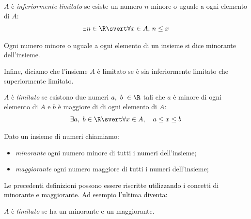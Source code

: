 \begin{newdef}{}{}
\(A\) è \emph{inferiormente limitato} se esiste un numero \(n\) 
minore o uguale a ogni elemento di \(A\):
\[\exists n \in \R \svert \forall x \in A,\, n \leq x\]
\end{newdef}

Ogni numero minore o uguale a ogni elemento di un insieme si dice minorante 
dell'insieme.


\vspace{.5em}
Infine, diciamo che l'insieme \(A\) è limitato se è sia inferiormente 
limitato che superiormente limitato.

\begin{newdef}{}{}
\(A\) è \emph{limitato} se esistono due numeri \(a,~b~ \in \R\) tali che 
\(a\) è minore di ogni elemento di \(A\) e \(b\) è maggiore di di ogni 
elemento di \(A\):
\[\exists a,~b \in \R \svert \forall x \in A,\quad a \leq x \leq b\]
\end{newdef}

\begin{newdef}{}{}
Dato un insieme di numeri chiamiamo:
\begin{itemize} [nosep]
\item \emph{minorante} ogni numero minore di tutti i numeri dell'insieme;
\item \emph{maggiorante} ogni numero maggiore di tutti i numeri 
dell'insieme;
\end{itemize}
\end{newdef}

Le precedenti definizioni possono essere riscritte utilizzando i concetti 
di minorante e maggiorante. 
Ad esempio l'ultima diventa:

\begin{newdef}{}{}
\(A\) è \emph{limitato} se ha un minorante e un maggiorante.
\end{newdef}

